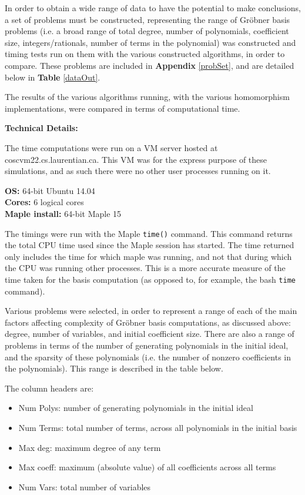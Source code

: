 \documentclass[letterpaper,12pt,titlepage,oneside,final]{book}
\newcounter{Table}
\begin{document}
In order to obtain a wide range of data to have the potential to make conclusions, a set of problems must be constructed, representing the range of Gr\"obner basis problems (i.e. a broad range of total degree, number of polynomials, coefficient size, integers/rationals, number of terms in the polynomial) was constructed and timing tests run on them with the various constructed algorithms, in order to compare.  These problems are included in \textbf{Appendix} \ref{probSet}, and are detailed below in \textbf{Table} \ref{dataOut}.

The results of the various algorithms running, with the various homomorphism implementations, were compared in terms of computational time.  

\noindent \textbf{Technical Details:}

The time computations were run on a VM server hosted at coscvm22.cs.laurentian.ca.  This VM was for the express purpose of these simulations, and as such there were no other user processes running on it.

\noindent \textbf{OS:} 64-bit Ubuntu 14.04\\
\textbf{Cores:} 6 logical cores\\
\textbf{Maple install:} 64-bit Maple 15

The timings were run with the Maple \texttt{time()} command.  This command returns the total CPU time used since the Maple session has started.  The time returned only includes the time for which maple was running, and not that during which the CPU was running other processes.  This is a more accurate measure of the time taken for the basis computation (as opposed to, for example, the bash \texttt{time} command).

Various problems were selected, in order to represent a range of each of the main factors affecting complexity of Gr\"obner basis computations, as discussed above: degree, number of variables, and initial coefficient size.  There are also a range of problems in terms of the number of generating polynomials in the initial ideal, and the sparsity of these polynomials (i.e. the number of nonzero coefficients in the polynomials).  This range is described in the table below.

The column headers are:
\begin{itemize}
  \item Num Polys: number of generating polynomials in the initial ideal 
  \item Num Terms: total number of terms, across all polynomials in the initial basis
  \item Max deg: maximum degree of any term
  \item Max coeff: maximum (absolute value) of all coefficients across all terms
  \item Num Vars: total number of variables 
\end{itemize} 
\end{document}
